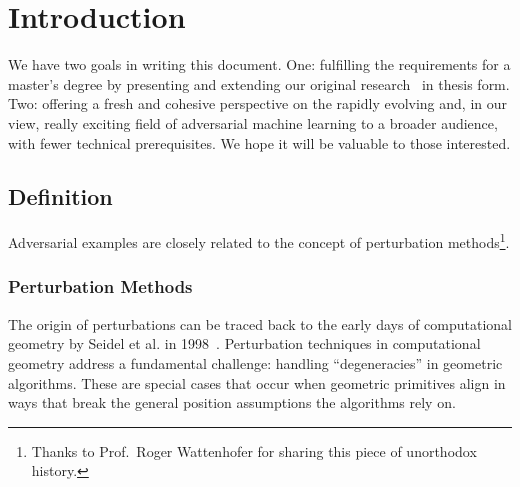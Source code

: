 \documentclass[a4paper, oneside]{discothesis}
\begin{document}
\mainmatter

\chapter{Introduction}

We have two goals in writing this document. One: fulfilling the requirements for a master's degree by presenting and extending our original research~\cite{jabary2024seeing} in thesis form. Two: offering a fresh and cohesive perspective on the rapidly evolving and, in our view, really exciting field of adversarial machine learning to a broader audience, with fewer technical prerequisites. We hope it will be valuable to those interested.

\section{Definition}

Adversarial examples are closely related to the concept of perturbation methods\footnote{Thanks to Prof.\ Roger Wattenhofer for sharing this piece of unorthodox history.}.

\subsection{Perturbation Methods}

The origin of perturbations can be traced back to the early days of computational geometry by Seidel et al. in 1998~\cite{seidel1998nature}. Perturbation techniques in computational geometry address a fundamental challenge: handling ``degeneracies'' in geometric algorithms. These are special cases that occur when geometric primitives align in ways that break the general position assumptions the algorithms rely on.
\end{document}
